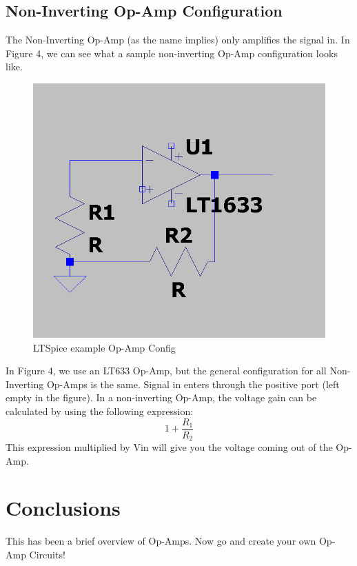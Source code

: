 \documentclass[letterpaper,12pt]{article}
\begin{document}
\subsection{Non-Inverting Op-Amp Configuration}
The Non-Inverting Op-Amp (as the name implies) only amplifies the signal in. In Figure 4, we can see what a sample non-inverting Op-Amp configuration looks like.
\begin{figure}
    \centering
    \includegraphics[scale=0.5]{op-amp3.PNG}
    \caption{LTSpice example Op-Amp Config}
\end{figure}
In Figure 4, we use an LT633 Op-Amp, but the general configuration for all Non-Inverting Op-Amps is the same. Signal in enters through the positive port (left empty in the figure). In a non-inverting Op-Amp, the voltage gain can be calculated by using the following expression:
\begin{equation}
   1+\frac{R_1}{R_2}
   \label{Eq:Non-Inverting} %
\end{equation}
This expression multiplied by Vin will give you the voltage coming out of the Op-Amp. 
\section{Conclusions}
This has been a brief overview of Op-Amps. Now go and create your own Op-Amp Circuits!
\end{document}
